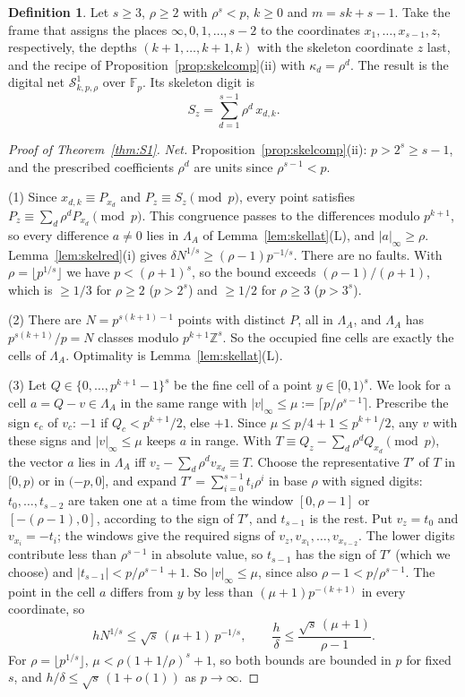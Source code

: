 \documentclass[11pt]{amsart}
\theoremstyle{definition}
\newtheorem{definition}[theorem]{Definition}
\theoremstyle{plain}
\newcommand{\Z}{\mathbb{Z}}
\newcommand{\F}{\mathbb{F}}
\begin{document}
\begin{definition}\label{def:S1}
Let $s\ge3$, $\rho\ge2$ with $\rho^s<p$, $k\ge0$ and $m=sk+s-1$. Take the frame that assigns the places $\infty,0,1,\dots,s-2$ to the coordinates $x_1,\dots,x_{s-1},z$, respectively, the depths $(k+1,\dots,k+1,k)$ with the skeleton coordinate $z$ last, and the recipe of Proposition~\ref{prop:skelcomp}(ii) with $\kappa_d=\rho^d$. The result is the digital net $\mathcal S^1_{k,p,\rho}$ over $\F_p$. Its skeleton digit is
\[
S_z=\sum_{d=1}^{s-1}\rho^d\,x_{d,k}.
\]
\end{definition}
\begin{proof}[Proof of Theorem~\ref{thm:S1}]
\emph{Net.} Proposition~\ref{prop:skelcomp}(ii): $p>2^s\ge s-1$, and the prescribed coefficients $\rho^d$ are units since $\rho^{s-1}<p$.

(1) Since $x_{d,k}\equiv P_{x_d}$ and $P_z\equiv S_z\pmod p$, every point satisfies $P_z\equiv\sum_d\rho^dP_{x_d}\pmod p$. This congruence passes to the differences modulo $p^{k+1}$, so every difference $a\ne0$ lies in $\Lambda_A$ of Lemma~\ref{lem:skellat}(L), and $|a|_\infty\ge\rho$. Lemma~\ref{lem:skelred}(i) gives $\delta N^{1/s}\ge(\rho-1)p^{-1/s}$. There are no faults. With $\rho=\lfloor p^{1/s}\rfloor$ we have $p<(\rho+1)^s$, so the bound exceeds $(\rho-1)/(\rho+1)$, which is $\ge1/3$ for $\rho\ge2$ ($p>2^s$) and $\ge1/2$ for $\rho\ge3$ ($p>3^s$).

(2) There are $N=p^{s(k+1)-1}$ points with distinct $P$, all in $\Lambda_A$, and $\Lambda_A$ has $p^{s(k+1)}/p=N$ classes modulo $p^{k+1}\Z^s$. So the occupied fine cells are exactly the cells of $\Lambda_A$. Optimality is Lemma~\ref{lem:skellat}(L).

(3) Let $Q\in\{0,\dots,p^{k+1}-1\}^s$ be the fine cell of a point $y\in[0,1)^s$. We look for a cell $a=Q-v\in\Lambda_A$ in the same range with $|v|_\infty\le\mu:=\lceil p/\rho^{s-1}\rceil$. Prescribe the sign $\epsilon_c$ of $v_c$: $-1$ if $Q_c<p^{k+1}/2$, else $+1$. Since $\mu\le p/4+1\le p^{k+1}/2$, any $v$ with these signs and $|v|_\infty\le\mu$ keeps $a$ in range. With $T\equiv Q_z-\sum_d\rho^dQ_{x_d}\pmod p$, the vector $a$ lies in $\Lambda_A$ iff $v_z-\sum_d\rho^dv_{x_d}\equiv T$. Choose the representative $T'$ of $T$ in $[0,p)$ or in $(-p,0]$, and expand $T'=\sum_{i=0}^{s-1}t_i\rho^i$ in base $\rho$ with signed digits: $t_0,\dots,t_{s-2}$ are taken one at a time from the window $[0,\rho-1]$ or $[-(\rho-1),0]$, according to the sign of $T'$, and $t_{s-1}$ is the rest. Put $v_z=t_0$ and $v_{x_i}=-t_i$; the windows give the required signs of $v_z,v_{x_1},\dots,v_{x_{s-2}}$. The lower digits contribute less than $\rho^{s-1}$ in absolute value, so $t_{s-1}$ has the sign of $T'$ (which we choose) and $|t_{s-1}|<p/\rho^{s-1}+1$. So $|v|_\infty\le\mu$, since also $\rho-1<p/\rho^{s-1}$. The point in the cell $a$ differs from $y$ by less than $(\mu+1)p^{-(k+1)}$ in every coordinate, so
\[
hN^{1/s}\le\sqrt s\,(\mu+1)\,p^{-1/s},\qquad \frac h\delta\le\frac{\sqrt s\,(\mu+1)}{\rho-1}.
\]
For $\rho=\lfloor p^{1/s}\rfloor$, $\mu<\rho(1+1/\rho)^s+1$, so both bounds are bounded in $p$ for fixed $s$, and $h/\delta\le\sqrt s\,(1+o(1))$ as $p\to\infty$.
\end{proof}
\end{document}
